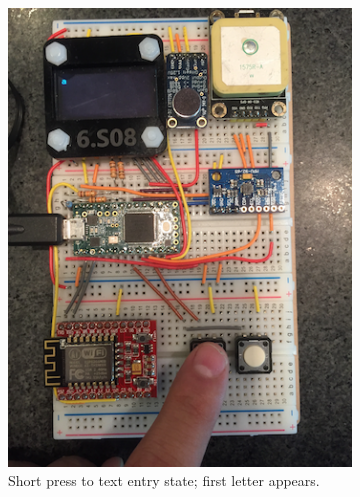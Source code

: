 \documentclass[12pt]{article}
\begin{document}
\begin{figure}
\begin{subfigure}[b]{.3\linewidth}
\includegraphics[width=\linewidth]{text-a}
\caption{Short press to text entry state; first letter appears.}
\label{fig:text-a}
\end{subfigure}
\begin{subfigure}[b]{.3\linewidth}

\end{subfigure}
\end{figure}
\end{document}
